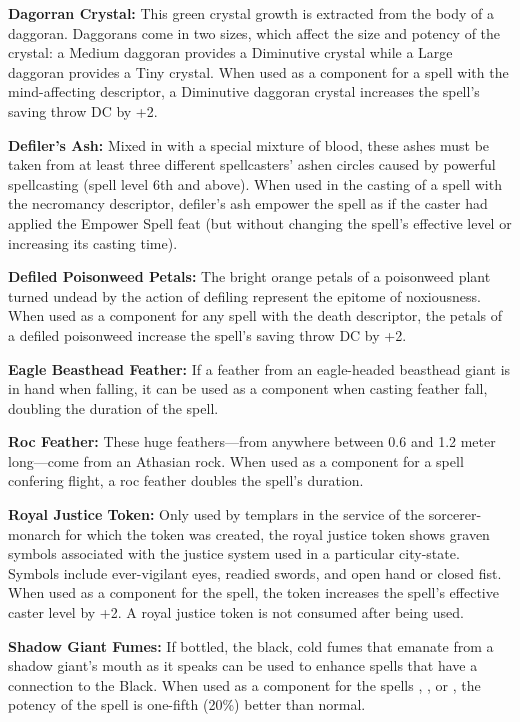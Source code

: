 \textbf{Dagorran Crystal:} This green crystal growth is extracted from the body of a daggoran. Daggorans come in two sizes, which affect the size and potency of the crystal: a Medium daggoran provides a Diminutive crystal while a Large daggoran provides a Tiny crystal. When used as a component for a spell with the mind-affecting descriptor, a Diminutive daggoran crystal increases the spell's saving throw DC by +2.

\textbf{Defiler's Ash:} Mixed in with a special mixture of blood, these ashes must be taken from at least three different spellcasters' ashen circles caused by powerful spellcasting (spell level 6th and above). When used in the casting of a spell with the necromancy descriptor, defiler's ash empower the spell as if the caster had applied the Empower Spell feat (but without changing the spell's effective level or increasing its casting time).

\textbf{Defiled Poisonweed Petals:} The bright orange petals of a poisonweed plant turned undead by the action of defiling represent the epitome of noxiousness. When used as a component for any spell with the death descriptor, the petals of a defiled poisonweed increase the spell's saving throw DC by +2.

\textbf{Eagle Beasthead Feather:} If a feather from an eagle-headed beasthead giant is in hand when falling, it can be used as a component when casting feather fall, doubling the duration of the spell.

\textbf{Roc Feather:} These huge feathers---from anywhere between 0.6 and 1.2 meter long---come from an Athasian rock. When used as a component for a spell confering flight, a roc feather doubles the spell's duration.

\textbf{Royal Justice Token:} Only used by templars in the service of the sorcerer-monarch for which the token was created, the royal justice token shows graven symbols associated with the justice system used in a particular city-state. Symbols include ever-vigilant eyes, readied swords, and open hand or closed fist. When used as a component for the  spell, the token increases the spell's effective caster level by +2. A royal justice token is not consumed after being used.

\textbf{Shadow Giant Fumes:} If bottled, the black, cold fumes that emanate from a shadow giant's mouth as it speaks can be used to enhance spells that have a connection to the Black. When used as a component for the spells , , or , the potency of the spell is one-fifth (20\%) better than normal.

